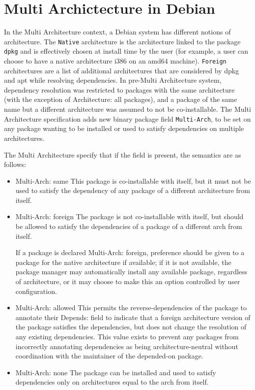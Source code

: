 \section{Multi Archictecture in Debian}

In the Multi Architecture context, a Debian system has different notions of
architecture. The \texttt{Native} architecture is the architecture linked to
the package \texttt{dpkg} and is effectively chosen at install time by the user
(for example, a user can choose to have a native architecture i386 on an amd64
machine). \texttt{Foreign} architectures are a list of additional
architectures that are considered by dpkg and apt while resolving dependencies. 
In pre-Multi Architecture system, dependency resolution was restricted to
packages with the same architecture (with the exception of Architecture: all
packages), and a package of the same name but a different architecture was
assumed to not be co-installable. The Multi Architecture specification adds new
binary package field \texttt{Multi-Arch}, to be set on any package wanting to
be installed or used to satisfy dependencies on multiple architectures.

The Multi Architecture specify that if the field is present, the semantics are as follows:

\begin{itemize}
  \item{Multi-Arch: same} This package is co-installable with itself,
    but it must not be used to satisfy the dependency of any package
    of a different architecture from itself. 
  \item{Multi-Arch: foreign} The package is not co-installable with
    itself, but should be allowed to satisfy the dependencies of a
    package of a different arch from itself.

    If a package is declared Multi-Arch: foreign, preference should be
    given to a package for the native architecture if available; if it
    is not available, the package manager may automatically install
    any available package, regardless of architecture, or it may
    choose to make this an option controlled by user configuration. 
  \item{Multi-Arch: allowed} This permits the reverse-dependencies of
    the package to annotate their Depends: field to indicate that a
    foreign architecture version of the package satisfies the
    dependencies, but does not change the resolution of any existing
    dependencies. This value exists to prevent any packages from
    incorrectly annotating dependencies as being architecture-neutral
    without coordination with the maintainer of the depended-on
    package. 
  \item{Multi-Arch: none}
    The package can be installed and used to satisfy dependencies only
    on architectures equal to the arch from itself.
\end{itemize}

